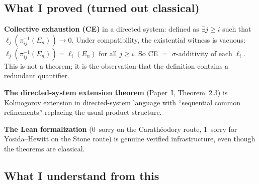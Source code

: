 \subsection{What I proved (turned out classical)}

\textbf{Collective exhaustion (CE)} in a directed system: defined
as $\exists j \geq i$ such that $\ell_j(\pi_{ij}^{-1}(E_n)) \to 0$.
Under compatibility, the existential witness is vacuous:
$\ell_j(\pi_{ij}^{-1}(E_n)) = \ell_i(E_n)$ for all $j \geq i$.
So CE $=$ $\sigma$-additivity of each $\ell_i$.  This is not a
theorem; it is the observation that the definition contains a
redundant quantifier.

\textbf{The directed-system extension theorem}
(Paper~I, Theorem~2.3) is Kolmogorov
extension in directed-system language with ``sequential common
refinements'' replacing the usual product structure.

\textbf{The Lean formalization} (0~sorry on the Carath\'{e}odory
route, 1~sorry for Yosida--Hewitt on the Stone route) is genuine
verified infrastructure, even though the theorems are classical.

\subsection{What I understand from this}

